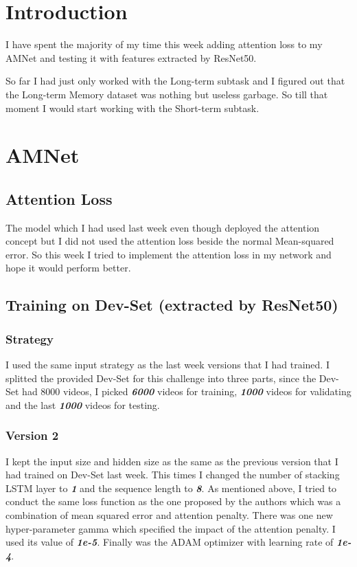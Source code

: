 \section{Introduction}
I have spent the majority of my time this week adding attention loss to my AMNet and testing it with features extracted by ResNet50.

So far I had just only worked with the Long-term subtask and I figured out that the Long-term Memory dataset was nothing but useless garbage. So till that moment I would start working with the Short-term subtask.

\section{AMNet}
\subsection{Attention Loss}
The model which I had used last week even though deployed the attention concept but I did not used the attention loss beside the normal Mean-squared error. So this week I tried to implement the attention loss in my network and hope it would perform better.


\subsection{Training on Dev-Set (extracted by ResNet50)}
\subsubsection{Strategy}
I used the same input strategy as the last week versions that I had trained. I splitted the provided Dev-Set for this challenge into three parts, since the Dev-Set had 8000 videos, I picked \textbf{\emph{6000}} videos for training, \textbf{\emph{1000}} videos for validating and the last \textbf{\emph{1000}} videos for testing.

\subsubsection{Version 2}
I kept the input size and hidden size as the same as the previous version that I had trained on Dev-Set last week. This times I changed the number of stacking LSTM layer to \textbf{\emph{1}} and the sequence length to \textbf{\emph{8}}. As mentioned above, I tried to conduct the same loss function as the one proposed by the authors which was a combination of mean squared error and attention penalty. There was one new hyper-parameter gamma which specified the impact of the attention penalty. I used its value of \textbf{\emph{1e-5}}. Finally was the ADAM optimizer with learning rate of \textbf{\emph{1e-4}}.

